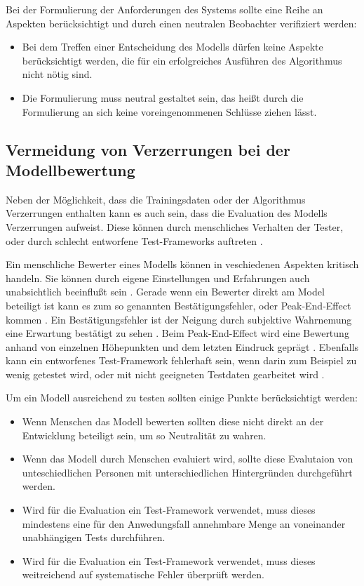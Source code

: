 \documentclass[12pt]{article}
\begin{document}
Bei der Formulierung der Anforderungen des Systems sollte eine Reihe an Aspekten berücksichtigt und durch einen neutralen Beobachter verifiziert werden:
\begin{itemize}
    \item Bei dem Treffen einer Entscheidung des Modells dürfen keine Aspekte berücksichtigt werden, die für ein erfolgreiches Ausführen des Algorithmus nicht nötig sind.
    \item Die Formulierung muss neutral gestaltet sein, das heißt durch die Formulierung an sich keine voreingenommenen Schlüsse ziehen lässt.
\end{itemize}

\subsection{Vermeidung von Verzerrungen bei der Modellbewertung}
Neben der Möglichkeit, dass die Trainingsdaten oder der Algorithmus Verzerrungen enthalten kann es auch sein, dass die Evaluation des Modells Verzerrungen aufweist.
Diese können durch menschliches Verhalten der Tester, oder durch schlecht entworfene Test-Frameworks auftreten \cite{Srinivasan}.

Ein menschliche Bewerter eines Modells können in veschiedenen Aspekten kritisch handeln. Sie können durch eigene Einstellungen und Erfahrungen auch unabsichtlich beeinflußt sein \cite{Srinivasan}.
Gerade wenn ein Bewerter direkt am Model beteiligt ist kann es zum so genannten Bestätigungsfehler, oder \glqq Peak-End-Effect\grqq{} kommen \cite{Srinivasan}.
Ein Bestätigungsfehler ist der Neigung durch subjektive Wahrnemung eine Erwartung bestätigt zu sehen \cite{Srinivasan}. 
Beim \glqq Peak-End-Effect\grqq{} wird eine Bewertung anhand von einzelnen Höhepunkten und dem letzten Eindruck geprägt \cite{Srinivasan}.
Ebenfalls kann ein entworfenes Test-Framework fehlerhaft sein, wenn darin zum Beispiel zu wenig getestet wird, oder mit nicht geeigneten Testdaten gearbeitet wird \cite{Srinivasan}.

Um ein Modell ausreichend zu testen sollten einige Punkte berücksichtigt werden:
\begin{itemize}
    \item Wenn Menschen das Modell bewerten sollten diese nicht direkt an der Entwicklung beteiligt sein, um so Neutralität zu wahren.
    \item Wenn das Modell durch Menschen evaluiert wird, sollte diese Evalutaion von unteschiedlichen Personen mit unterschiedlichen Hintergründen durchgeführt werden.
    \item Wird für die Evaluation ein Test-Framework verwendet, muss dieses mindestens eine für den Anwedungsfall annehmbare Menge an voneinander unabhängigen Tests durchführen.
    \item Wird für die Evaluation ein Test-Framework verwendet, muss dieses weitreichend auf systematische Fehler überprüft werden.
\end{itemize}
\end{document}
